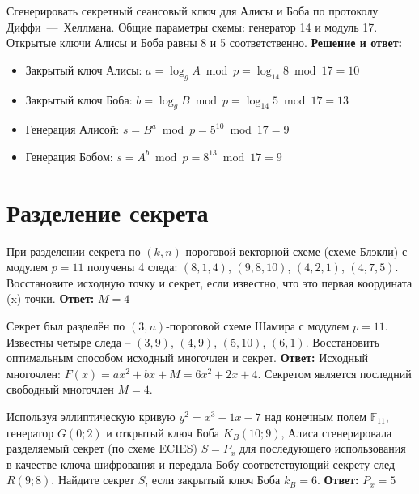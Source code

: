 \tasknumber Сгенерировать секретный сеансовый ключ для Алисы и Боба по протоколу Диффи~---~Хеллмана. Общие параметры схемы: генератор 14 и модуль 17. Открытые ключи Алисы и Боба равны 8 и 5 соответственно.
\medbreak
\textbf{Решение и ответ:}
\begin{itemize}
\item Закрытый ключ Алисы: $a = \log_{g} A \bmod p = \log_{14} 8 \bmod 17 = 10$
\item Закрытый ключ Боба: $b = \log_{g} B \bmod p = \log_{14} 5 \bmod 17 = 13$
\item Генерация Алисой: $s = {B}^{a} \bmod p  = {5}^{10} \bmod 17 = 9$
\item Генерация Бобом: $s = {A}^{b} \bmod p  = {8}^{13} \bmod 17 = 9$
\end{itemize}

\section{Разделение секрета}
\tasksection

\tasknumber При разделении секрета по $(k, n)$-пороговой векторной схеме (схеме Блэкли) с модулем $p = 11$ получены 4 следа: $\left( {8,1,4} \right)$, $\left( {9,8,10} \right)$, $\left( {4,2,1} \right)$, $\left( {4,7,5} \right)$. Восстановите исходную точку и секрет, если известно, что это первая координата (x) точки.
\medbreak
\textbf{Ответ:} $M = 4$
\bigbreak

\tasknumber Секрет был разделён по $(3, n)$-пороговой схеме Шамира с модулем $p=11$. Известны четыре следа -- $\left( {3,9} \right)$, $\left( {4,9} \right)$, $\left( {5,10} \right)$, $\left( {6,1} \right)$. Восстановить оптимальным способом исходный многочлен и секрет.
\medbreak
\textbf{Ответ:} Исходный многочлен: $F\left( x \right) = ax^2  + bx + M = 6x^2  + 2x + 4$. Секретом является последний свободный многочлен $M = 4$.
\bigbreak

\tasknumber Используя эллиптическую кривую $y^2 = x^3 - 1x - 7$ над конечным полем $\mathbb{F}_{11}$, генератор $G(0; 2)$ и открытый ключ Боба $K_B(10; 9)$, Алиса сгенерировала разделяемый секрет (по схеме ECIES) $S=P_x$ для последующего использования в качестве ключа шифрования и передала Бобу соответствующий секрету след $R(9; 8)$. Найдите секрет $S$, если закрытый ключ Боба $k_B = 6$.
\medbreak
\textbf{Ответ:} $P_x = 5$
